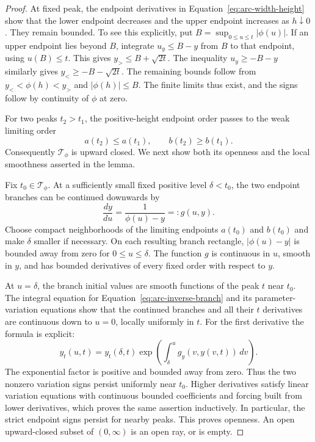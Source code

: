 \begin{proof}
At fixed peak, the endpoint derivatives in
Equation~\eqref{eq:arc-width-height} show that the lower endpoint
decreases and the upper endpoint increases as \(h\downarrow0\).
They remain bounded. To see this explicitly, put
\(B=\sup_{0\le u\le t}|\phi(u)|\). If an upper endpoint lies beyond
\(B\), integrate \(u_y\le B-y\) from \(B\) to that endpoint, using
\(u(B)\le t\). This gives \(y_>\le B+\sqrt{2t}\).
The inequality \(u_y\ge-B-y\) similarly gives
\(y_<\ge-B-\sqrt{2t}\). The remaining bounds follow from
\(y_<<\phi(h)<y_>\) and \(|\phi(h)|\le B\).
The finite limits thus exist, and the signs follow by continuity of
\(\phi\) at zero.

For two peaks \(t_2>t_1\), the positive-height endpoint order passes
to the weak limiting order
\[
  a(t_2)\le a(t_1),\qquad b(t_2)\ge b(t_1).
\]
Consequently \(\mathcal T_\phi\) is upward closed. We next show both
its openness and the local smoothness asserted in the lemma.

Fix \(t_0\in\mathcal T_\phi\). At a sufficiently small fixed positive
level \(\delta<t_0\), the two endpoint branches can be continued
downwards by
\begin{equation}\label{eq:arc-inverse-branch}
  \frac{dy}{du}=\frac1{\phi(u)-y}=:g(u,y).
\end{equation}
Choose compact neighborhoods of the limiting endpoints \(a(t_0)\)
and \(b(t_0)\) and make \(\delta\) smaller if necessary. On each
resulting branch rectangle, \(|\phi(u)-y|\) is bounded away from zero
for \(0\le u\le\delta\). The function \(g\) is continuous in \(u\),
smooth in \(y\), and has bounded derivatives of every fixed order
with respect to \(y\).

At \(u=\delta\), the branch initial values are smooth functions of
the peak \(t\) near \(t_0\). The integral equation for
Equation~\eqref{eq:arc-inverse-branch} and its parameter-variation
equations show that the continued branches and all their \(t\)
derivatives are continuous down to \(u=0\), locally uniformly in \(t\).
For the first derivative the formula is explicit:
\[
  y_t(u,t)=y_t(\delta,t)
      \exp\left(\int_\delta^u g_y(v,y(v,t))\,dv\right).
\]
The exponential factor is positive and bounded away from zero.
Thus the two nonzero variation signs persist uniformly near \(t_0\).
Higher derivatives satisfy linear variation equations with
continuous bounded coefficients and forcing built from lower
derivatives, which proves the same assertion inductively.
In particular, the strict endpoint signs persist for nearby peaks.
This proves openness. An open upward-closed subset of \((0,\infty)\)
is an open ray, or is empty.


\end{proof}
